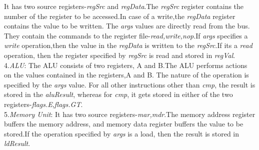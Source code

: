 \begin{ExerciseList}
It has two source registers-\textit{regSrc} and \textit{regData}.The \textit{regSrc} register contains the number of the register to be accessed.In case of a write,the \textit{regData} register contains the value to be written. The \textit{args} values are directly read from the bus. They contain the commands to the register file-\textit{read,write,nop}.If \textit{args} specifies a \textit{write} operation,then the value in the \textit{regData} is written to the \textit{regSrc}.If its a \textit{read} operation, then the register specified by \textit{regSrc} is read and stored in \textit{regVal}.\newline \\
4.\hspace{4mm}\textit{ALU}:\newline 
The ALU consists of two registers, A and B.The ALU performs actions on the values contained in the registers,A and B. The nature of the operation is specified by the \textit{args} value. For all other instructions other than \textit{cmp}, the result is stored in the \textit{aluResult}, whereas for \textit{cmp}, it gets stored in either of the two registers-\textit{flags.E},\textit{flags.GT}.\newline \\
5.\hspace{4mm}\textit{Memory Unit}:\newline 
It has two source registers-\textit{mar,mdr}.The memory address register buffers the memory address, and memory data register buffers the value to be stored.If the operation specified by \textit{args} is a load, then the result is stored in \textit{ldResult}.\newline
 

\end{ExerciseList}
